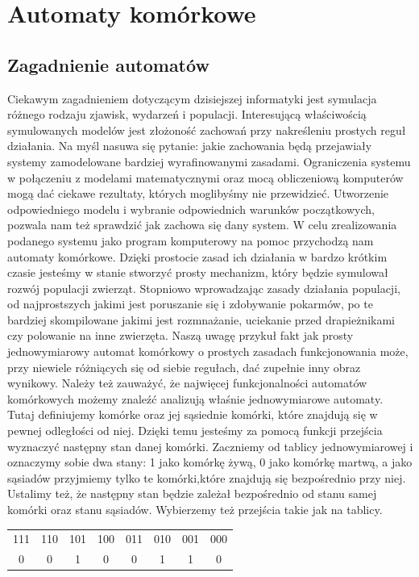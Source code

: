 \chapter{Automaty komórkowe}

\section{Zagadnienie automatów}

\noindent Ciekawym zagadnieniem dotyczącym dzisiejszej informatyki jest symulacja  różnego rodzaju zjawisk, wydarzeń i populacji. Interesującą właściwością symulowanych modelów jest złożoność zachowań przy nakreśleniu prostych reguł działania. Na myśl nasuwa się pytanie: jakie zachowania będą przejawiały systemy zamodelowane bardziej wyrafinowanymi zasadami. Ograniczenia systemu w połączeniu z modelami matematycznymi oraz mocą obliczeniową komputerów mogą dać ciekawe rezultaty, których moglibyśmy nie przewidzieć. Utworzenie odpowiedniego modelu i wybranie odpowiednich warunków początkowych, pozwala nam też sprawdzić jak zachowa się dany system.
\noindent W celu zrealizowania podanego systemu jako program komputerowy na pomoc przychodzą nam automaty komórkowe. Dzięki prostocie zasad ich działania w bardzo krótkim czasie jesteśmy w stanie stworzyć prosty mechanizm, który będzie symulował rozwój populacji zwierząt. Stopniowo wprowadzając zasady działania populacji, od najprostszych jakimi jest poruszanie się i zdobywanie pokarmów, po te bardziej skompilowane jakimi jest rozmnażanie, uciekanie przed drapieżnikami czy polowanie na inne zwierzęta. Naszą uwagę przykuł fakt jak prosty jednowymiarowy automat komórkowy o prostych zasadach funkcjonowania może, przy niewiele różniących się od siebie regułach, dać zupełnie inny obraz wynikowy. Należy też zauważyć, że najwięcej funkcjonalności automatów komórkowych możemy znaleźć analizują właśnie jednowymiarowe  automaty. Tutaj definiujemy komórke oraz jej sąsiednie komórki, które znajdują się w pewnej odległości od niej. Dzięki temu jesteśmy za pomocą funkcji przejścia wyznaczyć następny stan danej komórki. 
\noindent Zaczniemy od tablicy jednowymiarowej i oznaczymy sobie dwa stany: 1 jako komórkę żywą, 0 jako komórkę  martwą, a jako sąsiadów przyjmiemy tylko te komórki,które znajdują się bezpośrednio przy niej. Ustalimy też, że następny stan będzie zależał bezpośrednio od stanu samej komórki oraz stanu sąsiadów. Wybierzemy też przejścia takie jak na tablicy.

\begin{table}[h!]
\centering
\begin{tabular}{ |c|c|c|c|c|c|c|c| } 
	\hline
	111 & 110 & 101 & 100 & 011 & 010 & 001 & 000\\
	0 & 0 & 1 & 0 & 0 & 1 & 1 & 0 \\
	\hline
\end{tabular}
\label{table:1}
\end{table}
\clearpage

